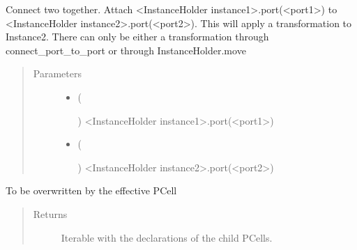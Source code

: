 \documentclass[a4paper,10pt,english]{sphinxmanual}
\begin{document}
\begin{fulllineitems}
\begin{fulllineitems}
Connect two  together. Attach \textless{}InstanceHolder instance1\textgreater{}.port(\textless{}port1\textgreater{}) to \textless{}InstanceHolder instance2\textgreater{}.port(\textless{}port2\textgreater{}).
This will apply a transformation to Instance2. There can only be either a transformation through connect\_port\_to\_port or through InstanceHolder.move
\begin{quote}\begin{description}
\item[{Parameters}] \leavevmode\begin{itemize}
\item {} 
 (%
\begin{footnote}[46]\sphinxAtStartFootnote
{}
%
\end{footnote}) \textendash{} \textless{}InstanceHolder instance1\textgreater{}.port(\textless{}port1\textgreater{})

\item {} 
 (%
\begin{footnote}[47]\sphinxAtStartFootnote
{}
%
\end{footnote}) \textendash{} \textless{}InstanceHolder instance2\textgreater{}.port(\textless{}port2\textgreater{})

\end{itemize}

\end{description}\end{quote}

\end{fulllineitems}


\begin{fulllineitems}
\label{\detokenize{photonics/photonics:kppc.photonics.PhotDevice.create_param_inst}}
To be overwritten by the effective PCell
\begin{quote}\begin{description}
\item[{Returns}] \leavevmode
Iterable with the declarations of the child PCells.


\end{description}
\end{quote}
\end{fulllineitems}
\end{fulllineitems}
\end{document}
